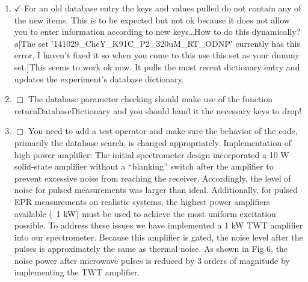 \documentclass[10pt]{book}
\begin{document}
\begin{enumerate}
    \item $\checkmark$ For an old database entry the keys and values pulled do not contain any of the new items. This is to be expected but not ok because it does not allow you to enter information according to new keys\ldots How to do this dynamically? \o[The set '141029_CheY_K91C_P2_320uM_RT_ODNP' currently has this error, I haven't fixed it so when you come to this use this set as your dummy set.]{This seems to work ok now. It pulls the most recent dictionary entry and updates the experiment's database dictionary.}
    \item $\Box$ The database parameter checking should make use of the function returnDatabaseDictionary and you should hand it the necessary keys to drop!
    \item $\Box$ You need to add a test operator and make sure the behavior of the code, primarily the database search, is changed appropriately.
Implementation of high power amplifier:
	The initial spectrometer design incorporated a 10 W solid-state amplifier without a “blanking” switch after the amplifier to prevent excessive noise from reaching the receiver. Accordingly, the level of noise for pulsed measurements was larger than ideal.  Additionally, for pulsed EPR measurements on realistic systems, the highest power amplifiers available (~1 kW) must be used to achieve the most uniform excitation possible. To address these issues we have implemented a 1 kW TWT amplifier into our spectrometer. Because this amplifier is gated, the noise level after the pulses is approximately the same as thermal noise. As shown in Fig 6, the noise power after microwave pulses is reduced by 3 orders of magnitude by implementing the TWT amplifier. 
 

\end{enumerate}
\end{document}
